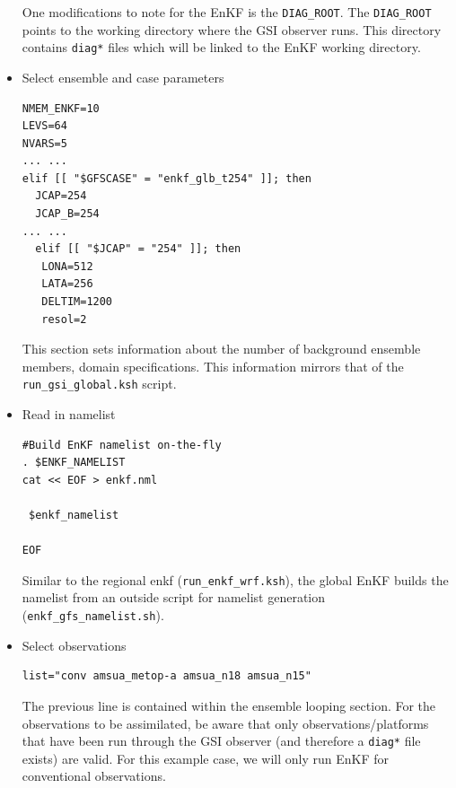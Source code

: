 \begin{itemize}
One modifications to note for the EnKF is the \verb|DIAG_ROOT|. The \verb|DIAG_ROOT| points to the working directory where the GSI observer runs. This directory contains \verb|diag*| files which will be linked to the EnKF working directory.\\

\item Select ensemble and case parameters

\begin{footnotesize}
\begin{verbatim}
NMEM_ENKF=10
LEVS=64
NVARS=5
... ...
elif [[ "$GFSCASE" = "enkf_glb_t254" ]]; then
  JCAP=254
  JCAP_B=254
... ...
  elif [[ "$JCAP" = "254" ]]; then
   LONA=512
   LATA=256
   DELTIM=1200
   resol=2
\end{verbatim}
\end{footnotesize}
This section sets information about the number of background ensemble members, domain specifications. This information mirrors that of the \verb|run_gsi_global.ksh| script.\\

\item Read in namelist

\begin{footnotesize}
\begin{verbatim}
#Build EnKF namelist on-the-fly
. $ENKF_NAMELIST
cat << EOF > enkf.nml

 $enkf_namelist

EOF
\end{verbatim}
\end{footnotesize}

Similar to the regional enkf (\verb|run_enkf_wrf.ksh|), the global EnKF builds the namelist from an outside script for namelist generation (\verb|enkf_gfs_namelist.sh|).\\

\item Select observations
\begin{footnotesize}
\begin{verbatim}
list="conv amsua_metop-a amsua_n18 amsua_n15"
\end{verbatim}
\end{footnotesize}
The previous line is contained within the ensemble looping section. For the observations to be assimilated, be aware that only observations/platforms that have been run through the GSI observer (and therefore a \verb|diag*| file exists) are valid. For this example case, we will only run EnKF for conventional observations.
\end{itemize}

